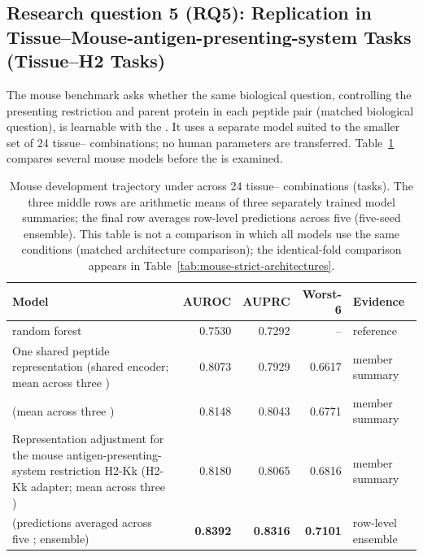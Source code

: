 \subsection{Research question 5 (RQ5): Replication in Tissue--Mouse-antigen-presenting-system Tasks (Tissue--H2 Tasks)}

The mouse benchmark asks whether the same biological question, controlling the presenting restriction and parent protein in each peptide pair (matched biological question), is learnable with the \plainHtwo{}. It uses a separate model suited to the smaller set of 24 tissue--\plainHtwo{} combinations; no human parameters are transferred. Table~\ref{tab:mouse-baselines} compares several mouse models before the \plainFixedTest{} is examined.

\begin{table}[tbp]
\centering
\caption{Mouse development trajectory under \plainPairOOF{} across 24 tissue--\plainHtwo{} combinations (tasks). The three middle rows are arithmetic means of three separately trained model summaries; the final row averages row-level predictions across five \plainSeeds{} (five-seed ensemble). This table is not a comparison in which all models use the same conditions (matched architecture comparison); the identical-fold \plainPeptideOOF{} comparison appears in Table~\ref{tab:mouse-strict-architectures}.}
\label{tab:mouse-baselines}
\footnotesize
\setlength{\tabcolsep}{3pt}
\begin{tabularx}{\textwidth}{>{\raggedright\arraybackslash}Xrrr
                            >{\raggedright\arraybackslash}p{1.8cm}}
\toprule
Model & AUROC & AUPRC & Worst-6 & Evidence \\ 
\midrule
\plainBLOSUM{} random forest & 0.7530 & 0.7292 & -- & reference \\ 
One shared peptide representation (shared encoder; mean across three \plainSeeds{}) & 0.8073 & 0.7929 & 0.6617 & member summary \\ 
\plainMMoE{} (mean across three \plainSeeds{}) & 0.8148 & 0.8043 & 0.6771 & member summary \\ 
Representation adjustment for the mouse antigen-presenting-system restriction H2-Kk (H2-Kk adapter; mean across three \plainSeeds{}) & 0.8180 & 0.8065 & 0.6816 & member summary \\ 
\plainMMoE{} (predictions averaged across five \plainSeeds{}; ensemble) & \textbf{0.8392} & \textbf{0.8316} & \textbf{0.7101} & row-level ensemble \\ 
\bottomrule
\end{tabularx}
\end{table}

